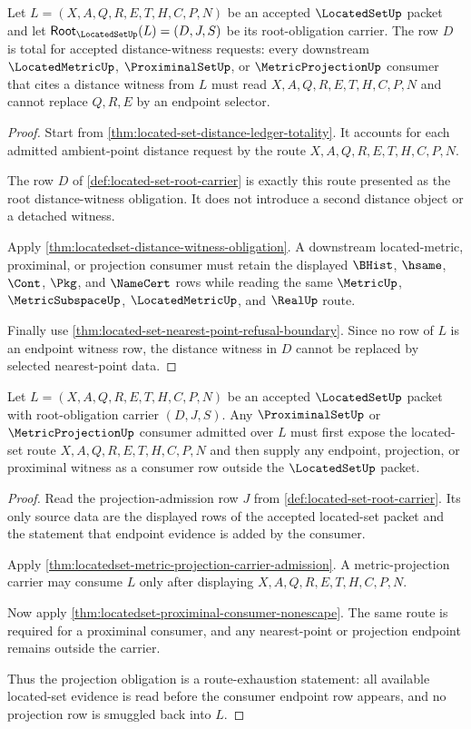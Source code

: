 \begin{theorem}
\label{thm:located-set-root-distance-witness}
Let $L=(X,A,Q,R,E,T,H,C,P,N)$ be an accepted $\LocatedSetUp$ packet and let $\mathsf{Root}_{\LocatedSetUp}(L)=(D,J,S)$ be its root-obligation carrier. The row $D$ is total for accepted distance-witness requests: every downstream $\LocatedMetricUp$, $\ProximinalSetUp$, or $\MetricProjectionUp$ consumer that cites a distance witness from $L$ must read $X,A,Q,R,E,T,H,C,P,N$ and cannot replace $Q,R,E$ by an endpoint selector.
\end{theorem}
\begin{proof}
Start from \autoref{thm:located-set-distance-ledger-totality}. It accounts for each admitted ambient-point distance request by the route $X,A,Q,R,E,T,H,C,P,N$.

The row $D$ of \autoref{def:located-set-root-carrier} is exactly this route presented as the root distance-witness obligation. It does not introduce a second distance object or a detached witness.

Apply \autoref{thm:locatedset-distance-witness-obligation}. A downstream located-metric, proximinal, or projection consumer must retain the displayed $\BHist$, $\hsame$, $\Cont$, $\Pkg$, and $\NameCert$ rows while reading the same $\MetricUp$, $\MetricSubspaceUp$, $\LocatedMetricUp$, and $\RealUp$ route.

Finally use \autoref{thm:located-set-nearest-point-refusal-boundary}. Since no row of $L$ is an endpoint witness row, the distance witness in $D$ cannot be replaced by selected nearest-point data.
\end{proof}

\begin{theorem}
\label{thm:located-set-root-projection-obligation}
Let $L=(X,A,Q,R,E,T,H,C,P,N)$ be an accepted $\LocatedSetUp$ packet with root-obligation carrier $(D,J,S)$. Any $\ProximinalSetUp$ or $\MetricProjectionUp$ consumer admitted over $L$ must first expose the located-set route $X,A,Q,R,E,T,H,C,P,N$ and then supply any endpoint, projection, or proximinal witness as a consumer row outside the $\LocatedSetUp$ packet.
\end{theorem}
\begin{proof}
Read the projection-admission row $J$ from \autoref{def:located-set-root-carrier}. Its only source data are the displayed rows of the accepted located-set packet and the statement that endpoint evidence is added by the consumer.

Apply \autoref{thm:locatedset-metric-projection-carrier-admission}. A metric-projection carrier may consume $L$ only after displaying $X,A,Q,R,E,T,H,C,P,N$.

Now apply \autoref{thm:locatedset-proximinal-consumer-nonescape}. The same route is required for a proximinal consumer, and any nearest-point or projection endpoint remains outside the carrier.

Thus the projection obligation is a route-exhaustion statement: all available located-set evidence is read before the consumer endpoint row appears, and no projection row is smuggled back into $L$.
\end{proof}

